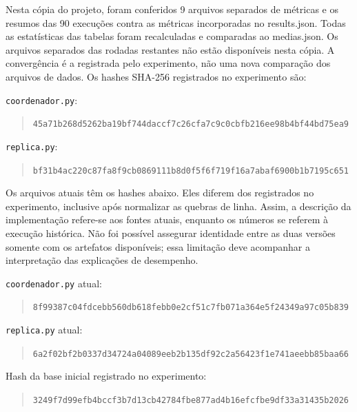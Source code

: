 Nesta cópia do projeto, foram conferidos 9 arquivos separados de métricas e os resumos das 90 execuções contra as métricas incorporadas no results.json. Todas as estatísticas das tabelas foram recalculadas e comparadas ao medias.json. Os arquivos separados das rodadas restantes não estão disponíveis nesta cópia. A convergência é a registrada pelo experimento, não uma nova comparação dos arquivos de dados.
Os hashes SHA-256 registrados no experimento são:
\par\noindent\texttt{coordenador.py}:
\begin{quote}\footnotesize\texttt{45a71b268d5262ba19bf744daccf7c26\allowbreak cfa7c9c0cbfb216ee98b4bf44bd75ea9}\end{quote}
\par\noindent\texttt{replica.py}:
\begin{quote}\footnotesize\texttt{bf31b4ac220c87fa8f9cb0869111b8d0\allowbreak f5f6f719f16a7abaf6900b1b7195c651}\end{quote}
Os arquivos atuais têm os hashes abaixo. Eles diferem dos registrados no experimento, inclusive após normalizar as quebras de linha. Assim, a descrição da implementação refere-se aos fontes atuais, enquanto os números se referem à execução histórica. Não foi possível assegurar identidade entre as duas versões somente com os artefatos disponíveis; essa limitação deve acompanhar a interpretação das explicações de desempenho.
\par\noindent\texttt{coordenador.py} atual:
\begin{quote}\footnotesize\texttt{8f99387c04fdcebb560db618febb0e2c\allowbreak f51c7fb071a364e5f24349a97c05b839}\end{quote}
\par\noindent\texttt{replica.py} atual:
\begin{quote}\footnotesize\texttt{6a2f02bf2b0337d34724a04089eeb2b1\allowbreak 35df92c2a56423f1e741aeebb85baa66}\end{quote}
\noindent Hash da base inicial registrado no experimento:
\begin{quote}\footnotesize\texttt{3249f7d99efb4bccf3b7d13cb42784fb\allowbreak e877ad4b16efcfbe9df33a31435b2026}\end{quote}